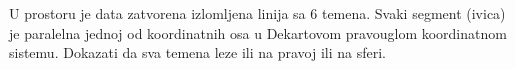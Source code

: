 \problem
U prostoru je data zatvorena izlomljena linija sa 6 temena.
Svaki segment (ivica) je paralelna jednoj od koordinatnih osa u Dekartovom pravouglom koordinatnom sistemu.
Dokazati da sva temena leze ili na pravoj ili na sferi.
\solution
\endproblem
